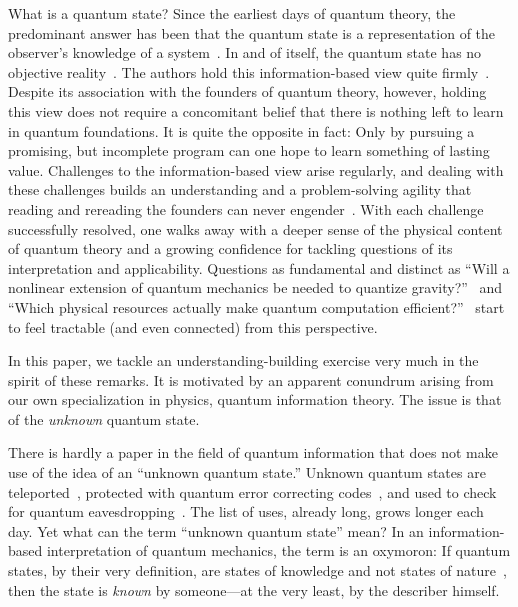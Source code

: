\documentclass[12pt,aps,eqsecnum]{revtex4-1}
\begin{document}
What is a quantum state?  Since the earliest days of quantum theory,
the predominant answer has been that the quantum state is a
representation of the observer's knowledge of a
system~\cite{Bohr1928}.  In and of itself, the quantum state has no
objective reality~\cite{Fuchs2000}.  The authors hold this
information-based view quite firmly~\cite{Caves1996,Caves1997}.
Despite its association with the founders of quantum theory,
however, holding this view does not require a concomitant belief
that there is nothing left to learn in quantum foundations. It is
quite the opposite in fact: Only by pursuing a promising, but
incomplete program can one hope to learn something of lasting value.
Challenges to the information-based view arise regularly, and
dealing with these challenges builds an understanding and a
problem-solving agility that reading and rereading the founders can
never engender~\cite{Faye1994}. With each challenge successfully
resolved, one walks away with a deeper sense of the physical content
of quantum theory and a growing confidence for tackling questions of
its interpretation and applicability. Questions as fundamental and
distinct as ``Will a nonlinear extension of quantum mechanics be
needed to quantize gravity?''~\cite{tHooft1999,Jozsa1998} and
``Which physical resources actually make quantum computation
efficient?''~\cite{Schack1999,Ambainis2000} start to feel tractable
(and even connected) from this perspective.

In this paper, we tackle an understanding-building exercise very
much in the spirit of these remarks.  It is motivated by an
apparent conundrum arising from our own specialization in physics,
quantum information theory.  The issue is that of the {\it
unknown\/} quantum state.

There is hardly a paper in the field of quantum information that
does not make use of the idea of an ``unknown quantum state.''
Unknown quantum states are
teleported~\cite{Bennett1993,Experiments1998}, protected with
quantum error correcting codes~\cite{Shor1995,Steane1996}, and used
to check for quantum
eavesdropping~\cite{Bennett1984,CryptoExperiments}.  The list of
uses, already long, grows longer each day.  Yet what can the term
``unknown quantum state'' mean? In an information-based
interpretation of quantum mechanics, the term is an oxymoron:  If
quantum states, by their very definition, are states of knowledge
and not states of nature~\cite{Hartle1968}, then the state is {\it
known\/} by someone---at the very least, by the describer himself.
\end{document}
